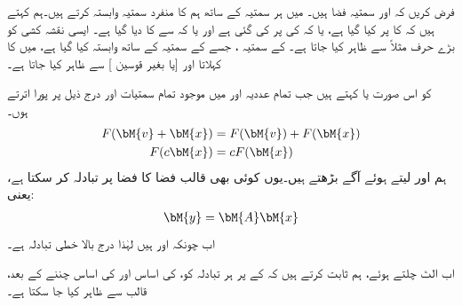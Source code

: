 فرض کریں کہ  اور  سمتیہ فضا ہیں۔ میں ہر سمتیہ  کے ساتھ ہم  کا منفرد سمتیہ  وابستہ کرتے ہیں۔ہم کہتے ہیں کہ  کا  پر  کیا گیا ہے، یا کہ  کی  پر    کی گئی ہے  اور یا کہ  سے  کا  دیا گیا ہے۔ ایسی نقشہ کشی کو بڑے حرف مثلاً  سے ظاہر کیا جاتا ہے۔ کے سمتیہ ، جسے  کے سمتیہ  کے ساتھ وابستہ کیا گیا ہے،  میں  کا  کہلاتا اور  [یا  بغیر قوسین ] سے ظاہر کیا جاتا ہے۔ 

کو  اس صورت   یا  کہتے  ہیں جب تمام عددیہ  اور  میں موجود تمام سمتیات  اور  درج ذیل پر پورا اترتے ہوں۔
\begin{gather}
\begin{aligned}\label{مساوات_الجبرا_خطی_نظام_تعریف}
F(\bM{v}+\bM{x})&=F(\bM{v})+F(\bM{x})\\
F(c\bM{x})&=cF(\bM{x})
\end{aligned}
\end{gather} 
ہم  اور  لیتے ہوئے آگے بڑھتے ہیں۔یوں کوئی بھی  قالب  فضا  کا فضا  پر تبادلہ کر سکتا ہے، یعنی:
\begin{align}\label{مساوات_الجبرا_تبادلہ_خطی_فضا_الف}
\bM{y}=\bM{A}\bM{x}
\end{align}
اب چونکہ  اور  ہیں لہٰذا درج بالا خطی تبادلہ ہے۔

اب الٹ چلتے ہوئے، ہم ثابت کرتے ہیں کہ  کے  پر ہر تبادلہ  کو،  کی اساس اور  کی اساس چننے کے بعد،   قالب  سے ظاہر کیا جا سکتا ہے۔

